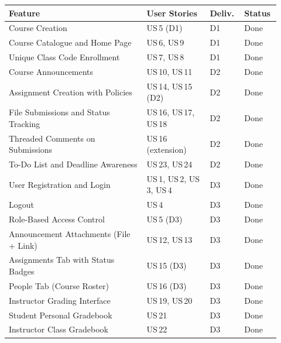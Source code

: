 \documentclass[12pt, a4paper]{article}
\begin{document}
\begin{center}\small
\begin{tabular}{@{}p{0.48\linewidth}p{0.22\linewidth}p{0.12\linewidth}p{0.10\linewidth}@{}}
  \toprule
  \textbf{Feature} & \textbf{User Stories} & \textbf{Deliv.} & \textbf{Status} \\
  \midrule
  Course Creation                             & US\,5 (D1)              & D1 & \textcolor{success}{Done} \\
Course Catalogue and Home Page      & US\,6, US\,9            & D1 & \textcolor{success}{Done} \\
  Unique Class Code Enrollment                & US\,7, US\,8            & D1 & \textcolor{success}{Done} \\
Course Announcements                & US\,10, US\,11          & D2 & \textcolor{success}{Done} \\
  Assignment Creation with Policies           & US\,14, US\,15 (D2)     & D2 & \textcolor{success}{Done} \\
File Submissions and Status Tracking & US\,16, US\,17, US\,18 & D2 & \textcolor{success}{Done} \\
  Threaded Comments on Submissions            & US\,16 (extension)      & D2 & \textcolor{success}{Done} \\
To-Do List and Deadline Awareness   & US\,23, US\,24          & D2 & \textcolor{success}{Done} \\
  User Registration and Login                 & US\,1, US\,2, US\,3, US\,4 & D3 & \textcolor{success}{Done} \\
Logout                              & US\,4                   & D3 & \textcolor{success}{Done} \\
  Role-Based Access Control                   & US\,5 (D3)              & D3 & \textcolor{success}{Done} \\
Announcement Attachments (File + Link) & US\,12, US\,13       & D3 & \textcolor{success}{Done} \\
  Assignments Tab with Status Badges          & US\,15 (D3)             & D3 & \textcolor{success}{Done} \\
People Tab (Course Roster)          & US\,16 (D3)             & D3 & \textcolor{success}{Done} \\
  Instructor Grading Interface                & US\,19, US\,20          & D3 & \textcolor{success}{Done} \\
Student Personal Gradebook          & US\,21                  & D3 & \textcolor{success}{Done} \\
  Instructor Class Gradebook                  & US\,22                  & D3 & \textcolor{success}{Done} \\
  \bottomrule
\end{tabular}
\end{center}
\end{document}
